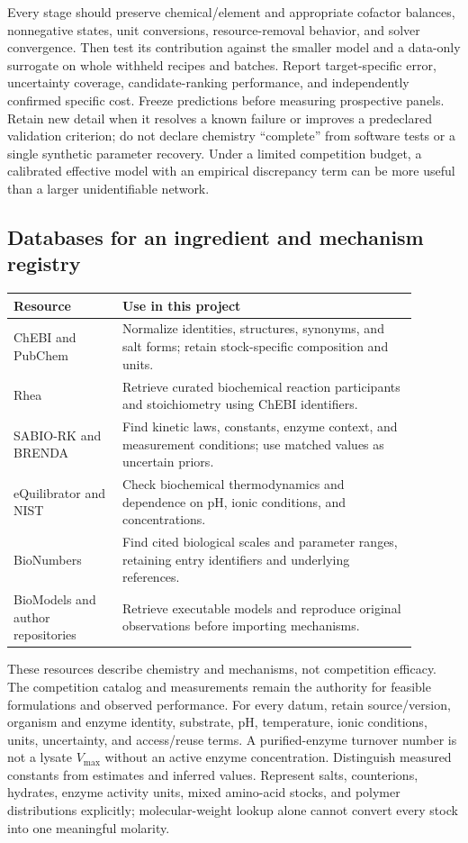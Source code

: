 Every stage should preserve chemical/element and appropriate cofactor balances,
nonnegative states, unit conversions, resource-removal behavior, and solver
convergence. Then test its contribution against the smaller model and a data-only
surrogate on whole withheld recipes and batches. Report target-specific error,
uncertainty coverage, candidate-ranking performance, and independently confirmed
specific cost. Freeze predictions before measuring prospective panels. Retain
new detail when it resolves a known failure or improves a predeclared validation
criterion; do not declare chemistry ``complete'' from software tests or a single
synthetic parameter recovery. Under a limited competition budget, a calibrated
effective model with an empirical discrepancy term can be more useful than a
larger unidentifiable network.

\subsection{Databases for an ingredient and mechanism registry}
\begin{center}
\small
\begin{tabular}{p{0.24\linewidth}p{0.65\linewidth}}
Resource & Use in this project\\\hline
ChEBI and PubChem & Normalize identities, structures, synonyms, and salt forms;
retain stock-specific composition and units\cite{chebi,pubchem}.\\
Rhea & Retrieve curated biochemical reaction participants and stoichiometry
using ChEBI identifiers\cite{rhea}.\\
SABIO-RK and BRENDA & Find kinetic laws, constants, enzyme context, and measurement
conditions; use matched values as uncertain priors\cite{sabio,brenda}.\\
eQuilibrator and NIST & Check biochemical thermodynamics and dependence on pH,
ionic conditions, and concentrations\cite{equilibrator,nist}.\\
BioNumbers & Find cited biological scales and parameter ranges, retaining entry
identifiers and underlying references\cite{bionumbers}.\\
BioModels and author repositories & Retrieve executable models and reproduce
original observations before importing mechanisms\cite{biomodels,horvath_code}.\\
\end{tabular}
\end{center}

These resources describe chemistry and mechanisms, not competition efficacy.
The competition catalog and measurements remain the authority for feasible
formulations and observed performance. For every datum, retain source/version,
organism and enzyme identity, substrate, pH, temperature, ionic conditions,
units, uncertainty, and access/reuse terms. A purified-enzyme turnover number
is not a lysate $V_{\max}$ without an active enzyme concentration. Distinguish
measured constants from estimates and inferred values. Represent salts,
counterions, hydrates, enzyme activity units, mixed amino-acid stocks, and polymer
distributions explicitly; molecular-weight lookup alone cannot convert every
stock into one meaningful molarity.

